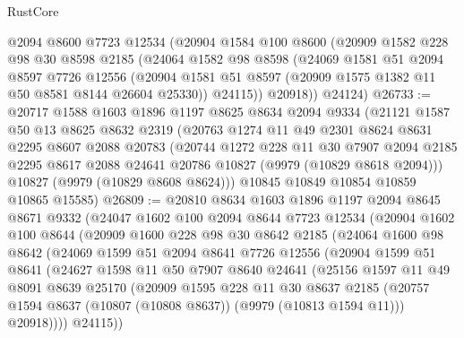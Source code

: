 \begin{lexlean}{RustCore}
\begin{coremodule}
      @2094
      @8600
      @7723
      @12534
      (@20904
        @1584
        @100
        @8600
        (@20909
          @1582
          @228
          @98
          @30
          @8598
          @2185
          (@24064
            @1582
            @98
            @8598
            (@24069
              @1581
              @51
              @2094
              @8597
              @7726
              @12556
              (@20904 @1581 @51 @8597 (@20909 @1575 @1382 @11 @50 @8581 @8144 @26604 @25330))
              @24115))
          @20918))
      @24124)
@26733 := @20717
    @1588
    @1603
    @1896
    @1197
    @8625
    @8634
    @2094
    @9334
    (@21121
      @1587
      @50
      @13
      @8625
      @8632
      @2319
      (@20763
        @1274
        @11
        @49
        @2301
        @8624
        @8631
        @2295
        @8607
        @2088
        @20783
        (@20744
          @1272
          @228
          @11
          @30
          @7907
          @2094
          @2185
          @2295
          @8617
          @2088
          @24641
          @20786
          @10827
          (@9979 (@10829 @8618 @2094)))
        @10827
        (@9979 (@10829 @8608 @8624)))
      @10845
      @10849
      @10854
      @10859
      @10865
      @15585)
@26809 := @20810
    @8634
    @1603
    @1896
    @1197
    @2094
    @8645
    @8671
    @9332
    (@24047
      @1602
      @100
      @2094
      @8644
      @7723
      @12534
      (@20904
        @1602
        @100
        @8644
        (@20909
          @1600
          @228
          @98
          @30
          @8642
          @2185
          (@24064
            @1600
            @98
            @8642
            (@24069
              @1599
              @51
              @2094
              @8641
              @7726
              @12556
              (@20904
                @1599
                @51
                @8641
                (@24627
                  @1598
                  @11
                  @50
                  @7907
                  @8640
                  @24641
                  (@25156
                    @1597
                    @11
                    @49
                    @8091
                    @8639
                    @25170
                    (@20909
                      @1595
                      @228
                      @11
                      @30
                      @8637
                      @2185
                      (@20757 @1594 @8637 (@10807 (@10808 @8637)) (@9979 (@10813 @1594 @11)))
                      @20918))))
              @24115))

\end{coremodule}
\end{lexlean}
